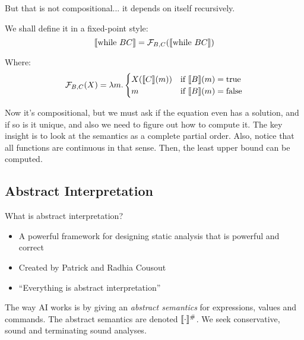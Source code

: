 But that is not compositional... it depends on itself recursively.

We shall define it in a fixed-point style:
\[
\llbracket \mathrm{while~} B C \rrbracket = \mathcal{F}_{B, C} (\llbracket \mathrm{while~} B C \rrbracket)
\]

Where:
\[
\mathcal{F}_{B, C} (X) = \lambda m. 
\begin{cases} 
X(\llbracket C \rrbracket(m)) & \text{if~} \llbracket B \rrbracket(m) = \mathrm{true} \\
m & \text{if~} \llbracket B \rrbracket(m) = \mathrm{false}
\end{cases}
\]

Now it's compositional, but we must ask if the equation even has a solution, and if so is it unique, and also
we need to figure out how to compute it. The key insight is to look at the semantics
as a complete partial order. Also, notice that all functions are continuous in that sense.
Then, the least upper bound can be computed.

\subsection{Abstract Interpretation}

What is abstract interpretation?
\begin{itemize}
\item A powerful framework for designing static analysis that is powerful and correct
\item Created by Patrick and Radhia Cousout
\item ``Everything is abstract interpretation''
\end{itemize}


The way AI works is by giving an \emph{abstract semantics} for expressions, values and commands.
The abstract semantics are denoted $\llbracket \cdot \rrbracket^\#$. We seek conservative, sound and terminating
sound analyses. 

